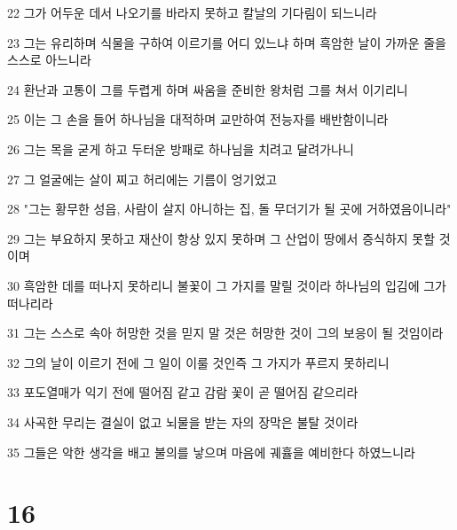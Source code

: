 \par 22 그가 어두운 데서 나오기를 바라지 못하고 칼날의 기다림이 되느니라
\par 23 그는 유리하며 식물을 구하여 이르기를 어디 있느냐 하며 흑암한 날이 가까운 줄을 스스로 아느니라
\par 24 환난과 고통이 그를 두렵게 하며 싸움을 준비한 왕처럼 그를 쳐서 이기리니
\par 25 이는 그 손을 들어 하나님을 대적하며 교만하여 전능자를 배반함이니라
\par 26 그는 목을 굳게 하고 두터운 방패로 하나님을 치려고 달려가나니
\par 27 그 얼굴에는 살이 찌고 허리에는 기름이 엉기었고
\par 28 "그는 황무한 성읍, 사람이 살지 아니하는 집, 돌 무더기가 될 곳에 거하였음이니라"
\par 29 그는 부요하지 못하고 재산이 항상 있지 못하며 그 산업이 땅에서 증식하지 못할 것이며
\par 30 흑암한 데를 떠나지 못하리니 불꽃이 그 가지를 말릴 것이라 하나님의 입김에 그가 떠나리라
\par 31 그는 스스로 속아 허망한 것을 믿지 말 것은 허망한 것이 그의 보응이 될 것임이라
\par 32 그의 날이 이르기 전에 그 일이 이룰 것인즉 그 가지가 푸르지 못하리니
\par 33 포도열매가 익기 전에 떨어짐 같고 감람 꽃이 곧 떨어짐 같으리라
\par 34 사곡한 무리는 결실이 없고 뇌물을 받는 자의 장막은 불탈 것이라
\par 35 그들은 악한 생각을 배고 불의를 낳으며 마음에 궤휼을 예비한다 하였느니라

\chapter{16}

